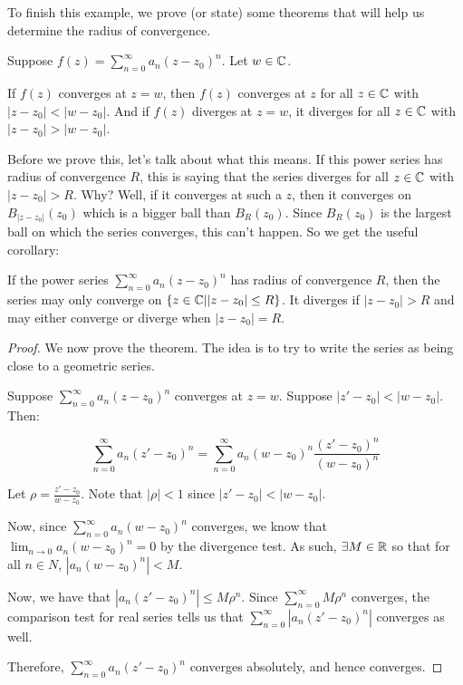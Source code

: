 To finish this example, we prove (or state) some theorems that will help us determine the radius of convergence.

\begin{thmbo}{}{} Suppose $f(z) = \sum_{n = 0}^\infty a_n(z-z_0)^n$. Let $w\in \mathbb{C}$.

If $f(z)$ converges at $z = w$, then $f(z)$ converges at $z$ for all $z\in \mathbb{C}$ with $|z-z_0| < |w-z_0|$. And if $f(z)$ diverges at $z = w$, it diverges for all $z\in\mathbb{C}$ with $|z-z_0| > |w-z_0|$.
\end{thmbo}

Before we prove this, let's talk about what this means. If this power series has radius of convergence $R$, this is saying that the series diverges for all $z\in\mathbb{C}$ with $|z-z_0| > R$. Why? Well, if it converges at such a $z$, then it converges on $B_{|z-z_0|}(z_0)$ which is a bigger ball than $B_R(z_0)$. Since $B_R(z_0)$ is the largest ball on which the series converges, this can't happen. So we get the useful corollary:

\begin{corbo}{}{} If the power series $ \sum_{n = 0}^\infty a_n(z-z_0)^n$ has radius of convergence $R$, then the series may only converge on $\{z\in\mathbb{C}||z-z_0|\le R\}$. It diverges if $|z-z_0| > R$ and may either converge or diverge when $|z-z_0| = R$.
\end{corbo}

\begin{proof}We now prove the theorem. The idea is to try to write the series as being close to a geometric series.

Suppose $\sum_{n=0}^\infty a_n(z-z_0)^n$ converges at $z = w$. Suppose $|z' - z_0| < |w-z_0|$. Then:

$$\sum_{n = 0}^\infty a_n(z'-z_0)^n = \sum_{n = 0}^\infty a_n(w-z_0)^n \frac{(z'-z_0)^n}{(w-z_0)^n}$$

Let $\rho = \frac{z'-z_0}{w-z_0}$. Note that $|\rho| < 1$ since $|z'-z_0| < |w-z_0|$.

Now, since $\sum_{n=0}^\infty a_n(w-z_0)^n$ converges, we know that $\lim_{n\rightarrow 0} a_n(w-z_0)^n = 0$ by the divergence test. As such, $\exists M\in \mathbb{R}$ so that for all $n\in N$, $|a_n(w-z_0)^n| < M$.

Now, we have that $|a_n(z'-z_0)^n| \le M\rho^n$. Since $\sum_{n = 0}^\infty M\rho^n$ converges, the comparison test for real series tells us that $\sum_{n = 0}^\infty |a_n(z'-z_0)^n|$ converges as well.

Therefore, $\sum_{n = 0}^\infty a_n(z'-z_0)^n$ converges absolutely, and hence converges.
\end{proof}

